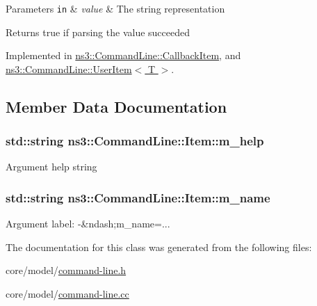 \begin{DoxyParams}[1]{Parameters}
\mbox{\tt in}  & {\em value} & The string representation \\
\hline
\end{DoxyParams}
\begin{DoxyReturn}{Returns}
{\ttfamily true} if parsing the value succeeded 
\end{DoxyReturn}


Implemented in \hyperlink{classns3_1_1CommandLine_1_1CallbackItem_a701690b58f756d9a89b227d3d228bd80}{ns3\+::\+Command\+Line\+::\+Callback\+Item}, and \hyperlink{classns3_1_1CommandLine_1_1UserItem_a1e35f03bcc7eea7343fcef8beec53dbb}{ns3\+::\+Command\+Line\+::\+User\+Item$<$ T $>$}.



\subsection{Member Data Documentation}
\subsubsection[{\texorpdfstring{m\+\_\+help}{m_help}}]{\setlength{\rightskip}{0pt plus 5cm}std\+::string ns3\+::\+Command\+Line\+::\+Item\+::m\+\_\+help}\hypertarget{classns3_1_1CommandLine_1_1Item_ae54cd153e6d77da544f1e22d876346bb}{}\label{classns3_1_1CommandLine_1_1Item_ae54cd153e6d77da544f1e22d876346bb}
Argument help string 
\subsubsection[{\texorpdfstring{m\+\_\+name}{m_name}}]{\setlength{\rightskip}{0pt plus 5cm}std\+::string ns3\+::\+Command\+Line\+::\+Item\+::m\+\_\+name}\hypertarget{classns3_1_1CommandLine_1_1Item_a9fe81cd5f78b2c1f6ca7951fbc573506}{}\label{classns3_1_1CommandLine_1_1Item_a9fe81cd5f78b2c1f6ca7951fbc573506}
Argument label\+: {\ttfamily -\/\&ndash};m\+\_\+name=... 

The documentation for this class was generated from the following files\+:\begin{DoxyCompactItemize}
\item 
core/model/\hyperlink{command-line_8h}{command-\/line.\+h}\item 
core/model/\hyperlink{command-line_8cc}{command-\/line.\+cc}\end{DoxyCompactItemize}
